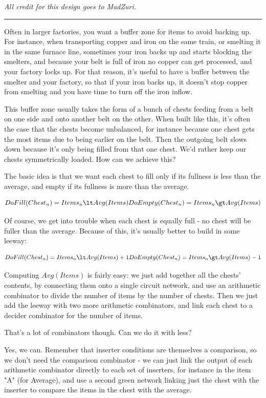 \documentclass{article}
\begin{document}
\emph{All credit for this design goes to MadZuri.}

\rule{10cm}{1pt}

Often in larger factories, you want a buffer zone for items to avoid backing up. For instance, when transporting copper and iron on the same train, or smelting it in the same furnace line, sometimes your iron backs up and starts blocking the smelters, and because your belt is full of iron no copper can get processed, and your factory locks up. For that reason, it's useful to have a buffer between the smelter and your factory, so that if your iron backs up, it doesn't stop copper from smelting and you have time to turn off the iron inflow.

This buffer zone usually takes the form of a bunch of chests feeding from a belt on one side and onto another belt on the other. When built like this, it's often the case that the chests become unbalanced, for instance because one chest gets the most items due to being earlier on the belt. Then the outgoing belt slows down because it's only being filled from that one chest. We'd rather keep our chests symmetrically loaded. How can we achieve this?

The basic idea is that we want each chest to fill only if its fullness is less than the average, and empty if its fullness is more than the average.

$$
DoFill(Chest_n) = Items_n \lt Avg(Items)\\
DoEmpty(Chest_n) = Items_n \gt Avg(Items)
$$

Of course, we get into trouble when each chest is equally full - no chest will be fuller than the average. Because of this, it's usually better to build in some leeway:

$$
DoFill(Chest_n) = Items_n \lt Avg(Items) + 1\\
DoEmpty(Chest_n) = Items_n \gt Avg(Items) - 1
$$

Computing $Avg(Items)$ is fairly easy: we just add together all the chests' contents, by connecting them
onto a single circuit network, and use an arithmetic combinator to divide the number of items by the number of chests. Then we just add the leeway with two more arithmetic combinators, and link each chest to a decider combinator for the number of items.

That's a lot of combinators though. Can we do it with less?

Yes, we can. Remember that inserter conditions are themselves a comparison, so we don't need the comparison combinator - we can just link the output of each arithmetic combinator directly to each set of inserters, for instance in the item "A" (for Average), and use a second green network linking just the chest with the inserter to compare the items in the chest with the average.
\end{document}
